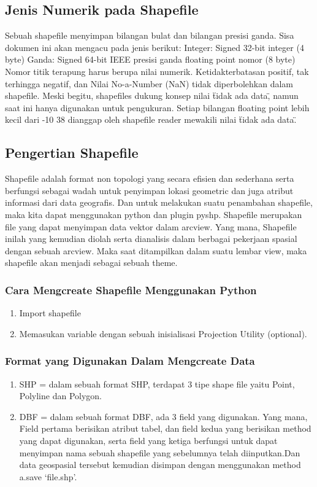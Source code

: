\subsection{Jenis Numerik pada Shapefile}
Sebuah shapefile menyimpan bilangan bulat dan bilangan presisi ganda. Sisa dokumen ini 
akan mengacu pada jenis berikut: 
Integer: Signed 32-bit integer (4 byte) 
Ganda: Signed 64-bit IEEE presisi ganda floating point nomor (8 byte) 
Nomor titik terapung harus berupa nilai numerik. Ketidakterbatasan positif, tak terhingga negatif, dan 
Nilai No-a-Number (NaN) tidak diperbolehkan dalam shapefile. Meski begitu, shapefiles 
dukung konsep nilai \"tidak ada data\", namun saat ini hanya digunakan untuk pengukuran. 
Setiap bilangan floating point lebih kecil dari -10 38 dianggap oleh shapefile reader 
mewakili nilai \"tidak ada data\". 

\subsection{Pengertian Shapefile}
	Shapefile adalah format non topologi yang secara efisien dan sederhana serta berfungsi sebagai wadah untuk penyimpan lokasi geometric dan juga atribut informasi dari data geografis. Dan untuk melakukan suatu penambahan shapefile, maka kita dapat menggunakan python dan plugin pyshp. Shapefile merupakan file yang dapat menyimpan data vektor dalam arcview. Yang mana, Shapefile inilah yang kemudian diolah serta dianalisis dalam berbagai pekerjaan spasial dengan sebuah arcview. Maka saat ditampilkan dalam suatu lembar view, maka shapefile  akan menjadi sebagai sebuah theme.

\subsubsection{Cara Mengcreate Shapefile Menggunakan Python}
\begin{enumerate}
    \item Import shapefile
    \item Memasukan variable dengan sebuah inisialisasi
Projection Utility (optional).
\end{enumerate}

\subsubsection{Format yang Digunakan Dalam Mengcreate Data}
\begin{enumerate}
     \item SHP = dalam sebuah format SHP, terdapat 3 tipe shape file yaitu Point, Polyline dan Polygon.
     \item DBF = dalam sebuah format DBF, ada 3 field yang digunakan. Yang mana, Field pertama  berisikan   atribut    tabel, dan                        field kedua yang berisikan method yang dapat digunakan, serta field yang ketiga berfungsi untuk dapat menyimpan                          nama sebuah shapefile yang sebelumnya telah diinputkan.Dan data geospasial tersebut kemudian disimpan dengan menggunakan method a.save ‘file.shp’.
\end{enumerate}

